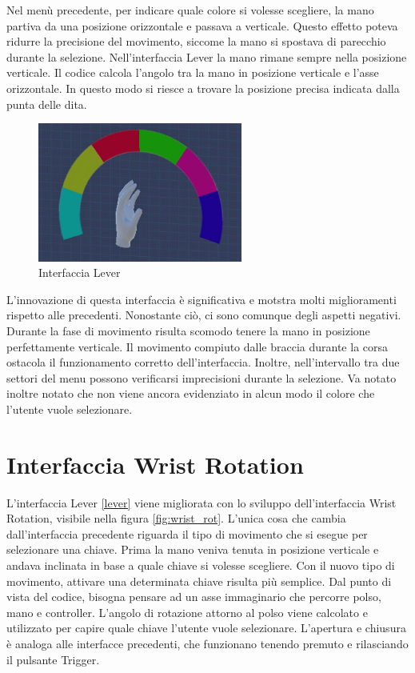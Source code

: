 \documentclass[target=bach,aauheader=]{thud}
\begin{document}
Nel menù precedente, per indicare quale colore si volesse scegliere, la mano partiva da una posizione orizzontale e passava a verticale.
Questo effetto poteva ridurre la precisione del movimento, siccome la mano si spostava di parecchio durante la selezione.
Nell'interfaccia Lever la mano rimane sempre nella posizione verticale.
Il codice calcola l'angolo tra la mano in posizione verticale e l'asse orizzontale.
In questo modo si riesce a trovare la posizione precisa indicata dalla punta delle dita.
 
\begin{figure}[h]
    \centering
    \includegraphics[width=0.60\textwidth]{lever}
    \caption{Interfaccia Lever}
    \label{fig:lever}
\end{figure}

L'innovazione di questa interfaccia è significativa e motstra molti miglioramenti rispetto alle precedenti.
Nonostante ciò, ci sono comunque degli aspetti negativi.
Durante la fase di movimento risulta scomodo tenere la mano in posizione perfettamente verticale.
Il movimento compiuto dalle braccia durante la corsa ostacola il funzionamento corretto dell'interfaccia.
Inoltre, nell'intervallo tra due settori del menu possono verificarsi imprecisioni durante la selezione.
Va notato inoltre notato che non viene ancora evidenziato in alcun modo il colore che l'utente vuole selezionare. 

\section{Interfaccia Wrist Rotation} %
\label{wrist_rot}
L'interfaccia Lever \ref{lever} viene migliorata con lo sviluppo dell'interfaccia Wrist Rotation, visibile nella figura \ref{fig:wrist_rot}.
L'unica cosa che cambia dall'interfaccia precedente riguarda il tipo di movimento che si esegue per selezionare una chiave.
Prima la mano veniva tenuta in posizione verticale e andava inclinata in base a quale chiave si volesse scegliere.
Con il nuovo tipo di movimento, attivare una determinata chiave risulta più semplice.
Dal punto di vista del codice, bisogna pensare ad un asse immaginario che percorre polso, mano e controller.
L'angolo di rotazione attorno al polso viene calcolato e utilizzato per capire quale chiave l'utente vuole selezionare.
L'apertura e chiusura è analoga alle interfacce precedenti, che funzionano tenendo premuto e rilasciando il pulsante Trigger. \\
\end{document}
